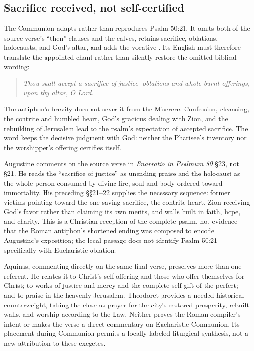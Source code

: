 \subsection*{Sacrifice received, not self-certified\enspace{}}

The Communion adapts rather than reproduces Psalm 50:21. It omits both of the
source verse's ``then'' clauses and the calves, retains sacrifice, oblations,
holocausts, and God's altar, and adds the vocative . Its English
must therefore translate the appointed chant rather than silently restore the
omitted biblical wording:

\begin{quote}

\medskip
\emph{Thou shalt accept a sacrifice of justice, oblations and whole burnt
offerings, upon thy altar, O Lord.}
\end{quote}

The antiphon's brevity does not sever it from the Miserere. Confession,
cleansing, the contrite and humbled heart, God's gracious dealing with Zion,
and the rebuilding of Jerusalem lead to the psalm's expectation of accepted
sacrifice. The word  keeps the decisive judgment with God:
neither the Pharisee's inventory nor the worshipper's offering certifies
itself.

Augustine comments on the source verse in \emph{Enarratio in Psalmum 50}
\S23, not \S21. He reads the ``sacrifice of justice'' as unending praise and
the holocaust as the whole person consumed by divine fire, soul and body
ordered toward immortality. His preceding \S\S21--22 supplies the necessary
sequence: former victims pointing toward the one saving sacrifice, the
contrite heart, Zion receiving God's favor rather than claiming its own
merits, and walls built in faith, hope, and charity. This is a Christian
reception of the complete psalm, not evidence that the Roman antiphon's
shortened ending was composed to encode Augustine's exposition; the local
passage does not identify Psalm 50:21 specifically with Eucharistic oblation.

Aquinas, commenting directly on the same final verse, preserves more than one
referent. He relates it to Christ's self-offering and those who offer
themselves for Christ; to works of justice and mercy and the complete
self-gift of the perfect; and to praise in the heavenly Jerusalem. Theodoret
provides a needed historical counterweight, taking the close as prayer for the
city's restored prosperity, rebuilt walls, and worship according to the Law.
Neither proves the Roman compiler's intent or makes the verse a direct
commentary on Eucharistic Communion. Its placement during Communion permits a
locally labeled liturgical synthesis, not a new attribution to these
exegetes.

